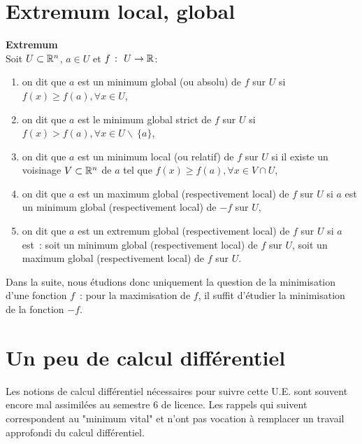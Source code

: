 \section{Extremum local, global}

\begin{definition}\label{maximum}\textbf{Extremum}\\

Soit \(U\subset \mathbb{R}^n\), \(a\in U\) et \(f\ \colon\  U\to \mathbb{R}\):
\begin{enumerate}
\item on dit que \(a\) est un minimum global (ou absolu) de \(f\) sur \(U\) si \(f(x) \geq f(a), \forall x \in U\),
\item on dit que \(a\) est le minimum global strict de \(f\) sur \(U\) si \(f(x) > f(a), \forall x \in U\backslash\ \{a\}\),
\item on dit que \(a\) est un minimum local (ou relatif) de \(f\) sur \(U\) si il existe un voisinage \(V\subset \mathbb{R}^n\) de \(a\) tel que \(f(x) \geq f(a), \forall x \in V\cap U\),
\item on dit que \(a\) est un maximum global (respectivement local) de \(f\) sur \(U\) si \(a\) est un minimum global (respectivement local) de \(-f\) sur \(U\),
\item on dit que \(a\) est un extremum global (respectivement local) de \(f\) sur \(U\) si \(a\) est~: soit un minimum global (respectivement local) de \(f\) sur \(U\), soit un maximum global (respectivement local) de \(f\) sur \(U\).
\end{enumerate}
\end{definition}

Dans la suite, nous étudions donc uniquement la question de la minimisation d'une fonction \(f\)~: pour la maximisation de \(f\), il suffit d'étudier la minimisation de la fonction \(-f\).


\section{Un peu de calcul différentiel}


Les notions de calcul différentiel nécessaires pour suivre cette U.E. sont souvent encore mal assimilées au semestre 6 de licence. Les rappels qui suivent correspondent au "minimum vital" et n'ont pas vocation à remplacer un travail approfondi du calcul différentiel.\\

